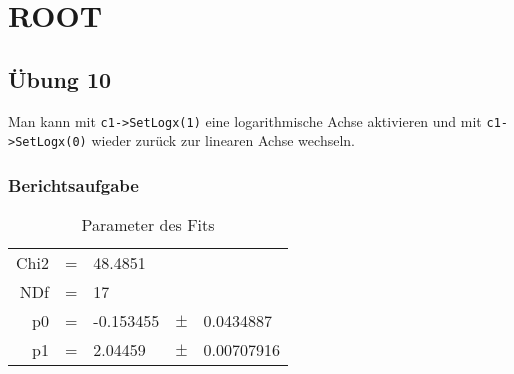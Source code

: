
\part{ROOT}

\chapter{Übung 10}

Man kann mit \texttt{c1->SetLogx(1)} eine logarithmische Achse aktivieren und mit \texttt{c1->SetLogx(0)} wieder zurück zur linearen Achse wechseln.

\section{Berichtsaufgabe}


\begin{table}[h]
\begin{center}
\begin{tabular}{rclcl}
Chi2 & = & 48.4851 &  \\ 
NDf & = & 17 &  \\ 
p0 & = & -0.153455 & $\pm$ & 0.0434887 \\ 
p1 & = & 2.04459 & $\pm$ & 0.00707916 \\ 
\end{tabular} 
\caption{Parameter des Fits}
\label{table:fit}
\end{center}
\end{table}